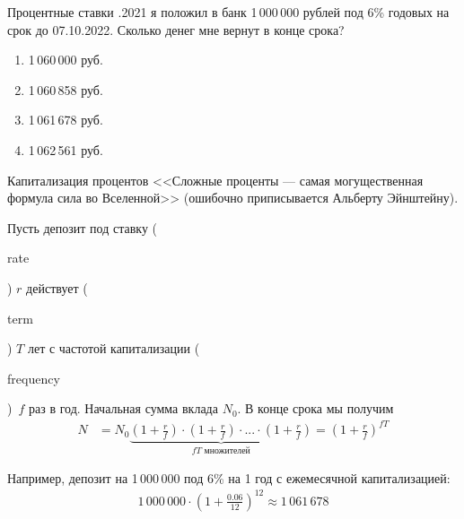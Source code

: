 \documentclass{beamer}
\newcommand{\en}[1]{\begin{otherlanguage}{english}#1\end{otherlanguage}}
\begin{document}
\begin{frame}{Процентные ставки}
.2021 я положил в банк 1\,000\,000 рублей под 6\% годовых на срок до 07.10.2022. Сколько денег мне вернут в конце срока?

\begin{enumerate}[label=\Alph*]
\item 1\,060\,000 руб. 
\item 1\,060\,858 руб. 
\item 1\,061\,678 руб. 
\item 1\,062\,561 руб. 
\end{enumerate}

\end{frame}


\begin{frame}{Капитализация процентов}
\justify
<<Сложные проценты --- самая могущественная формула сила во Вселенной>> (ошибочно приписывается Альберту Эйнштейну).

\justify
Пусть депозит под ставку (\en{rate}) $r$ действует (\en{term}) $T$ лет с частотой капитализации (\en{frequency})\ $f$ раз в год. Начальная сумма вклада $N_0$. В конце срока мы получим
\begin{align*}
N &= N_0\underbrace{\left(1 + \frac{r}{f}\right) \cdot \left(1 + \frac{r}{f}\right) \cdot ... \cdot \left(1 + \frac{r}{f}\right)}_{fT \text{\ множителей}} = 
 \left(1 + \frac{r}{f}\right)^{fT}
\end{align*}

Например, депозит на 1\,000\,000 под 6\% на 1 год с ежемесячной капитализацией:
\begin{align*}
1\,000\,000 \cdot \left(1 + \frac{0.06}{12}\right)^{12} \approx 1\,061\,678
\end{align*}
\end{frame}
\end{document}
